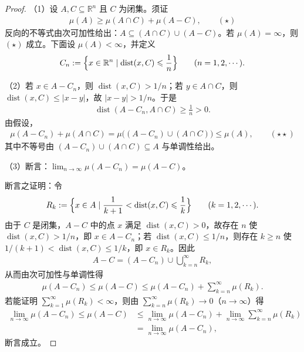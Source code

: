 \documentclass[../../main.tex]{subfiles}
\begin{document}
\begin{proof}
（1）设 $A,C\subseteq\mathbb{R}^{n}$ 且 $C$ 为闭集。须证
\begin{align*}
\mu(A)\geqslant\mu(A\cap C)+\mu(A-C),\qquad(\star)
\end{align*}
反向的不等式由次可加性给出：$A\subseteq(A\cap C)\cup(A-C)$。若 $\mu(A)=\infty$，则 $(\star)$ 成立。下面设 $\mu(A)<\infty$，并定义
\begin{align*}
C_{n}:=\Bigl\{x\in\mathbb{R}^{n}\mid\operatorname{dist}(x,C)\leqslant\frac{1}{n}\Bigr\}\qquad(n=1,2,\cdots).
\end{align*}

（2）若 $x\in A-C_{n}$，则 $\operatorname{dist}(x,C)>1/n$；若 $y\in A\cap C$，则 $\operatorname{dist}(x,C)\leqslant|x-y|$，故 $|x-y|>1/n$。于是
\begin{align*}
\operatorname{dist}(A-C_{n},A\cap C)\geqslant\frac{1}{n}>0.
\end{align*}
由假设，
\begin{align*}
\mu(A-C_{n})+\mu(A\cap C)=\mu\bigl((A-C_{n})\cup(A\cap C)\bigr)\leqslant\mu(A),\qquad(\star\star)
\end{align*}
其中不等号由 $(A-C_{n})\cup(A\cap C)\subseteq A$ 与单调性给出。

（3）断言：$\lim_{n\to\infty}\mu(A-C_{n})=\mu(A-C)$。

断言之证明：令
\begin{align*}
R_{k}:=\Bigl\{x\in A\mid\frac{1}{k+1}<\operatorname{dist}(x,C)\leqslant\frac{1}{k}\Bigr\}\qquad(k=1,2,\cdots).
\end{align*}
由于 $C$ 是闭集，$A-C$ 中的点 $x$ 满足 $\operatorname{dist}(x,C)>0$，故存在 $n$ 使 $\operatorname{dist}(x,C)>1/n$，即 $x\in A-C_{n}$；若 $\operatorname{dist}(x,C)\leqslant1/n$，则存在 $k\geqslant n$ 使 $1/(k+1)<\operatorname{dist}(x,C)\leqslant1/k$，即 $x\in R_{k}$。因此
\begin{align*}
A-C=(A-C_{n})\cup\bigcup_{k=n}^{\infty}R_{k},
\end{align*}
从而由次可加性与单调性得
\begin{align*}
\mu(A-C_{n})\leqslant\mu(A-C)\leqslant\mu(A-C_{n})+\sum_{k=n}^{\infty}\mu(R_{k}).
\end{align*}
若能证明 $\sum_{k=1}^{\infty}\mu(R_{k})<\infty$，则由 $\sum_{k=n}^{\infty}\mu(R_{k})\to0$（$n\to\infty$）得
\begin{align*}
\lim_{n\to\infty}\mu(A-C_{n})\leqslant\mu(A-C)&\leqslant\lim_{n\to\infty}\mu(A-C_{n})+\lim_{n\to\infty}\sum_{k=n}^{\infty}\mu(R_{k})\\
&=\lim_{n\to\infty}\mu(A-C_{n}),
\end{align*}
断言成立。


\end{proof}
\end{document}
